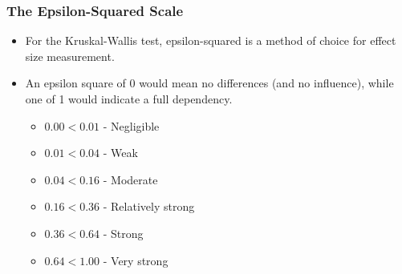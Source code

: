 \documentclass[a4paper]{article}
\begin{document}
\subsubsection{The Epsilon-Squared Scale}
\begin{itemize}
    \item[] For the Kruskal-Wallis test, epsilon-squared is a method of choice for effect size measurement.
        
    \item[] An epsilon square of 0 would mean no differences (and no influence), while one of 1 would indicate a full dependency.
    \begin{itemize}
        \item[] $0.00 < 0.01$ - Negligible
        \item[] $0.01 < 0.04$ - Weak
        \item[] $0.04 < 0.16$ - Moderate
        \item[] $0.16 < 0.36$ - Relatively strong
        \item[] $0.36 < 0.64$ - Strong
        \item[] $0.64 < 1.00$ - Very strong
    \end{itemize}
\end{itemize}
\end{document}
